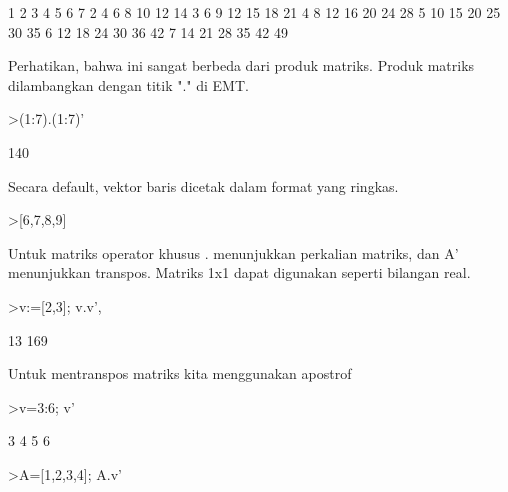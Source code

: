\documentclass[a4paper,10pt]{article}
\begin{document}
\begin{eulernotebook}
\begin{eulercomment}
\begin{eulercomment}
\begin{eulercomment}
\begin{eulercomment}
\begin{euleroutput}
       1      2      3      4      5      6      7 
       2      4      6      8     10     12     14 
       3      6      9     12     15     18     21 
       4      8     12     16     20     24     28 
       5     10     15     20     25     30     35 
       6     12     18     24     30     36     42 
       7     14     21     28     35     42     49 
\end{euleroutput}
\begin{eulercomment}
Perhatikan, bahwa ini sangat berbeda dari produk matriks. Produk
matriks dilambangkan dengan titik "." di EMT.
\end{eulercomment}
\begin{eulerprompt}
>(1:7).(1:7)'
\end{eulerprompt}
\begin{euleroutput}
  140
\end{euleroutput}
\begin{eulercomment}
Secara default, vektor baris dicetak dalam format yang ringkas.
\end{eulercomment}
\begin{eulerprompt}
>[6,7,8,9]
\end{eulerprompt}
\begin{euleroutput}
  [6,  7,  8,  9]
\end{euleroutput}
\begin{eulercomment}
Untuk matriks operator khusus . menunjukkan perkalian matriks, dan A'
menunjukkan transpos. Matriks 1x1 dapat digunakan seperti bilangan
real.
\end{eulercomment}
\begin{eulerprompt}
>v:=[2,3]; v.v', %
\end{eulerprompt}
\begin{euleroutput}
  13
  169
\end{euleroutput}
\begin{eulercomment}
Untuk mentranspos matriks kita menggunakan apostrof
\end{eulercomment}
\begin{eulerprompt}
>v=3:6; v'
\end{eulerprompt}
\begin{euleroutput}
              3 
              4 
              5 
              6 
\end{euleroutput}
\begin{eulerprompt}
>A=[1,2,3,4]; A.v'
\end{eulerprompt}
\begin{euleroutput}

\end{euleroutput}
\end{eulercomment}
\end{eulercomment}
\end{eulercomment}
\end{eulercomment}
\end{eulernotebook}
\end{document}

